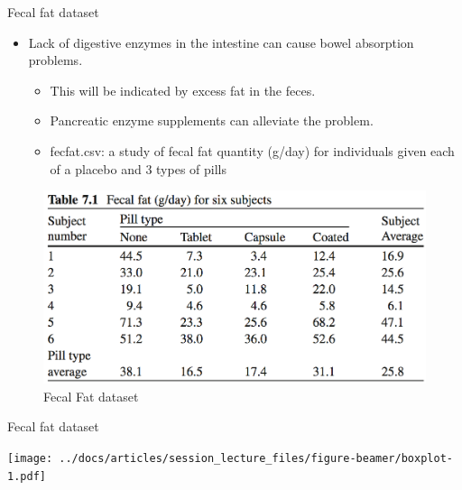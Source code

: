 \documentclass[
  ignorenonframetext,
]{beamer}
\providecommand{\tightlist}{%
  \setlength{\itemsep}{0pt}\setlength{\parskip}{0pt}}
\begin{document}
\begin{frame}{Fecal fat dataset}
\protect\hypertarget{fecal-fat-dataset}{}

\begin{itemize}
\tightlist
\item
  Lack of digestive enzymes in the intestine can cause bowel absorption
  problems.

  \begin{itemize}
  \tightlist
  \item
    This will be indicated by excess fat in the feces.
  \item
    Pancreatic enzyme supplements can alleviate the problem.
  \item
    fecfat.csv: a study of fecal fat quantity (g/day) for individuals
    given each of a placebo and 3 types of pills
  \end{itemize}
\end{itemize}

\begin{figure}
\centering
\includegraphics{VittinghoffTable71.png}
\caption{Fecal Fat dataset}
\end{figure}

\end{frame}

\begin{frame}{Fecal fat dataset}
\protect\hypertarget{fecal-fat-dataset-1}{}

\texttt{[image: ../docs/articles/session\_lecture\_files/figure-beamer/boxplot-1.pdf]}

\end{frame}
\end{document}
